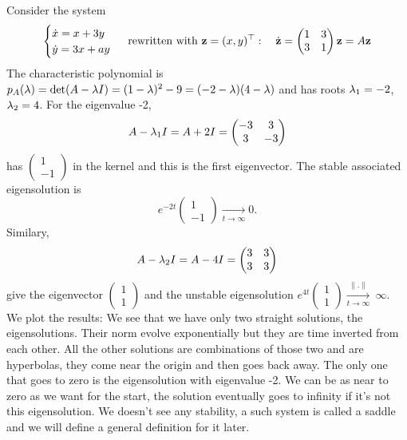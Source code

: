 \begin{exemple}[saddle]
Consider the system
$$\begin{cases}
    \dot{x}=x+3y \\
    \dot{y}=3x+ay
\end{cases}
\text{ rewritten with } \mathbf{z}=(x,y)^\top: \quad \dot{\mathbf{z}}=
\begin{pmatrix} 1&3\\3&1 \end{pmatrix}\mathbf{z} =A\mathbf{z}
$$
The characteristic polynomial is $p_A(\lambda)=\det(A-\lambda I)=(1-\lambda)^2-9=(-2-\lambda)(4-\lambda)$ and has roots $\lambda_1=-2$, $\lambda_2=4$. For the eigenvalue -2, $$ A-\lambda_1I = A+2I= \begin{pmatrix} -3&3\\3&-3 \end{pmatrix} $$
has $\begin{pmatrix}1\\-1\end{pmatrix}$ in the kernel and this is the first eigenvector. The stable associated eigensolution is $$e^{-2t}\begin{pmatrix}1\\-1\end{pmatrix} \xrightarrow[t\to\infty]{} 0.$$
Similary, 
$$ A-\lambda_2I = A-4I= \begin{pmatrix} 3&3\\3&3 \end{pmatrix} $$
give the eigenvector $\begin{pmatrix}1\\1\end{pmatrix}$ and the unstable eigensolution $e^{4t}\begin{pmatrix}1\\1\end{pmatrix}\xrightarrow[t\to\infty]{\|.\|}~\infty$. We plot the results: 
We see that we have only two straight solutions, the eigensolutions. Their norm evolve exponentially but they are time inverted from each other. All the other solutions are combinations of those two and are hyperbolas, they come near the origin and then goes back away. The only one that goes to zero is the eigensolution with eigenvalue -2. We can be as near to zero as we want for the start, the solution eventually goes to infinity if it's not this eigensolution. We doesn't see any stability, a such system is called a saddle and we will define a general definition for it later.
\end{exemple}

